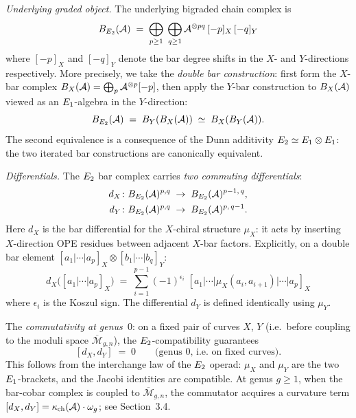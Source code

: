 \medskip
\noindent\textit{Underlying graded object.}
The underlying bigraded chain complex is
\begin{equation}\label{eq:be2-underlying}
 B_{E_2}(\mathcal{A})
 \;=\;
 \bigoplus_{p \geq 1}\; \bigoplus_{q \geq 1}
 \mathcal{A}^{\otimes pq}\,[-p]_X\,[-q]_Y
\end{equation}
where $[-p]_X$ and $[-q]_Y$ denote the bar degree shifts in the $X$-
and $Y$-directions respectively. More precisely, we take the
\emph{double bar construction}: first form the $X$-bar complex
$B_X(\mathcal{A}) = \bigoplus_p \mathcal{A}^{\otimes p}[-p]$, then apply the
$Y$-bar construction to $B_X(\mathcal{A})$ viewed as an $E_1$-algebra
in the $Y$-direction:
\begin{equation}\label{eq:be2-iterated}
 B_{E_2}(\mathcal{A})
 \;=\;
 B_Y(B_X(\mathcal{A}))
 \;\simeq\;
 B_X(B_Y(\mathcal{A})).
\end{equation}
The second equivalence is a consequence of the Dunn additivity
$E_2 \simeq E_1 \otimes E_1$: the two iterated bar constructions
are canonically equivalent.

\medskip
\noindent\textit{Differentials.}
The $E_2$ bar complex carries \emph{two commuting differentials}:
\begin{align}
 d_X &\colon B_{E_2}(\mathcal{A})^{p,q} \;\to\;
 B_{E_2}(\mathcal{A})^{p-1,\,q}, \label{eq:dX}\\
 d_Y &\colon B_{E_2}(\mathcal{A})^{p,q} \;\to\;
 B_{E_2}(\mathcal{A})^{p,\,q-1}. \label{eq:dY}
\end{align}
Here $d_X$ is the bar differential for the $X$-chiral structure
$\mu_X$: it acts by inserting $X$-direction OPE residues between
adjacent $X$-bar factors. Explicitly, on a double bar element
$[a_1 | \cdots | a_p]_X \otimes [b_1 | \cdots | b_q]_Y$:
\begin{equation}\label{eq:dX-explicit}
 d_X\bigl([a_1 | \cdots | a_p]_X\bigr)
 \;=\;
 \sum_{i=1}^{p-1} (-1)^{\epsilon_i}\;
 [a_1 | \cdots | \mu_X(a_i, a_{i+1}) | \cdots | a_p]_X
\end{equation}
where $\epsilon_i$ is the Koszul sign. The differential $d_Y$ is
defined identically using $\mu_Y$.

The \emph{commutativity at genus~$0$}: on a fixed pair of curves $X$, $Y$
(i.e.\ before coupling to the moduli space $\overline{\mathcal{M}}_{g,n}$),
the $E_2$-compatibility guarantees
\[
 [d_X, d_Y] \;=\; 0 \qquad\text{(genus $0$, i.e.\ on fixed curves)}.
\]
This follows from the interchange law of the $E_2$ operad: $\mu_X$ and
$\mu_Y$ are the two $E_1$-brackets, and the Jacobi identities are
compatible. At genus $g \geq 1$, when the bar-cobar complex is coupled to
$\overline{\mathcal{M}}_{g,n}$, the commutator acquires a curvature term
$[d_X, d_Y] = \kappa_{\mathrm{ch}}(\mathcal{A}) \cdot \omega_g$; see Section~3.4.

